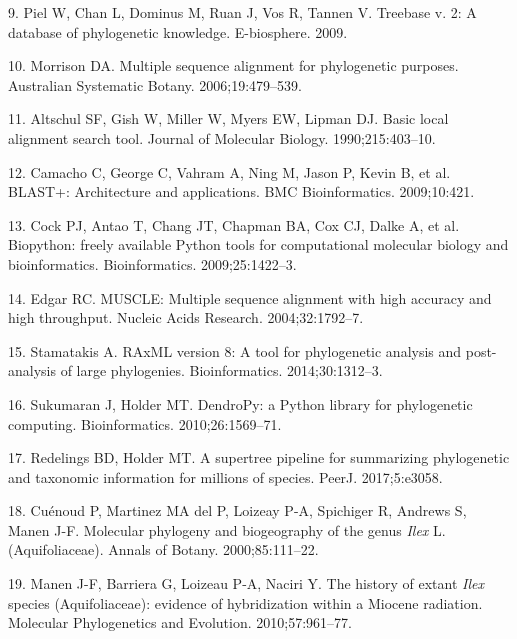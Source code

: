 \documentclass[]{article}
\begin{document}
\leavevmode\hypertarget{ref-piel2009treebase}{}%
9. Piel W, Chan L, Dominus M, Ruan J, Vos R, Tannen V. Treebase v. 2: A database of phylogenetic knowledge. E-biosphere. 2009.

\leavevmode\hypertarget{ref-morrison2006multiple}{}%
10. Morrison DA. Multiple sequence alignment for phylogenetic purposes. Australian Systematic Botany. 2006;19:479--539.

\leavevmode\hypertarget{ref-altschul1990basic}{}%
11. Altschul SF, Gish W, Miller W, Myers EW, Lipman DJ. Basic local alignment search tool. Journal of Molecular Biology. 1990;215:403--10.

\leavevmode\hypertarget{ref-camacho2009blast}{}%
12. Camacho C, George C, Vahram A, Ning M, Jason P, Kevin B, et al. BLAST+: Architecture and applications. BMC Bioinformatics. 2009;10:421.

\leavevmode\hypertarget{ref-cock2009biopython}{}%
13. Cock PJ, Antao T, Chang JT, Chapman BA, Cox CJ, Dalke A, et al. Biopython: freely available Python tools for computational molecular biology and bioinformatics. Bioinformatics. 2009;25:1422--3.

\leavevmode\hypertarget{ref-edgar2004muscle}{}%
14. Edgar RC. MUSCLE: Multiple sequence alignment with high accuracy and high throughput. Nucleic Acids Research. 2004;32:1792--7.

\leavevmode\hypertarget{ref-stamatakis2014raxml}{}%
15. Stamatakis A. RAxML version 8: A tool for phylogenetic analysis and post-analysis of large phylogenies. Bioinformatics. 2014;30:1312--3.

\leavevmode\hypertarget{ref-sukumaran2010dendropy}{}%
16. Sukumaran J, Holder MT. DendroPy: a Python library for phylogenetic computing. Bioinformatics. 2010;26:1569--71.

\leavevmode\hypertarget{ref-redelings2017supertree}{}%
17. Redelings BD, Holder MT. A supertree pipeline for summarizing phylogenetic and taxonomic information for millions of species. PeerJ. 2017;5:e3058.

\leavevmode\hypertarget{ref-cuenoud2000molecular}{}%
18. Cuénoud P, Martinez MA del P, Loizeay P-A, Spichiger R, Andrews S, Manen J-F. Molecular phylogeny and biogeography of the genus \emph{Ilex} L.(Aquifoliaceae). Annals of Botany. 2000;85:111--22.

\leavevmode\hypertarget{ref-manen2010history}{}%
19. Manen J-F, Barriera G, Loizeau P-A, Naciri Y. The history of extant \emph{Ilex} species (Aquifoliaceae): evidence of hybridization within a Miocene radiation. Molecular Phylogenetics and Evolution. 2010;57:961--77.
\end{document}
